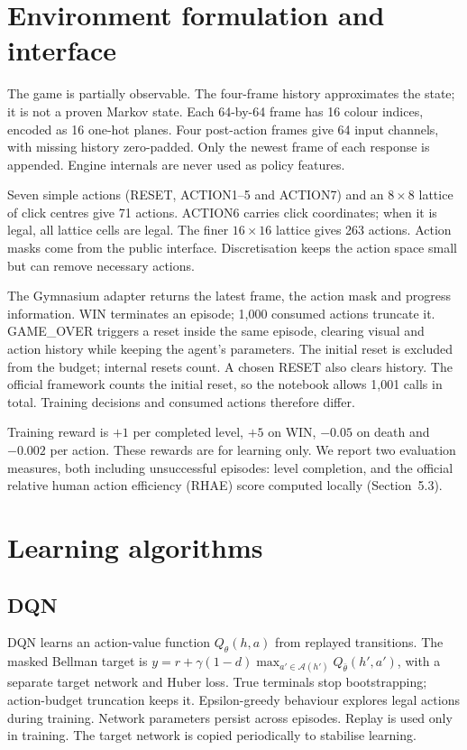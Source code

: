 \documentclass[10pt]{article}
\begin{document}
\section{Environment formulation and interface}
The game is partially observable. The four-frame history approximates the state; it is not a proven Markov state. Each 64-by-64 frame has 16 colour indices, encoded as 16 one-hot planes. Four post-action frames give 64 input channels, with missing history zero-padded. Only the newest frame of each response is appended. Engine internals are never used as policy features.

Seven simple actions (RESET, ACTION1--5 and ACTION7) and an $8\times8$ lattice of click centres give 71 actions. ACTION6 carries click coordinates; when it is legal, all lattice cells are legal. The finer $16\times16$ lattice gives 263 actions. Action masks come from the public interface. Discretisation keeps the action space small but can remove necessary actions.

The Gymnasium adapter returns the latest frame, the action mask and progress information. WIN terminates an episode; 1,000 consumed actions truncate it. GAME\_OVER triggers a reset inside the same episode, clearing visual and action history while keeping the agent's parameters. The initial reset is excluded from the budget; internal resets count. A chosen RESET also clears history. The official framework counts the initial reset, so the notebook allows 1,001 calls in total. Training decisions and consumed actions therefore differ.

Training reward is $+1$ per completed level, $+5$ on WIN, $-0.05$ on death and $-0.002$ per action. These rewards are for learning only. We report two evaluation measures, both including unsuccessful episodes: level completion, and the official relative human action efficiency (RHAE) score computed locally (Section~5.3).

\section{Learning algorithms}
\subsection{DQN}
DQN learns an action-value function $Q_\theta(h,a)$ from replayed transitions. The masked Bellman target is $y=r+\gamma(1-d)\max_{a'\in\mathcal A(h')}Q_{\bar\theta}(h',a')$, with a separate target network and Huber loss. True terminals stop bootstrapping; action-budget truncation keeps it. Epsilon-greedy behaviour explores legal actions during training. Network parameters persist across episodes. Replay is used only in training. The target network is copied periodically to stabilise learning.
\end{document}
